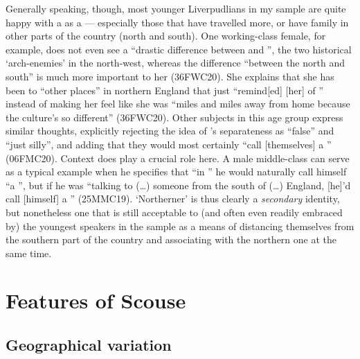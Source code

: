 Generally speaking, though, most younger Liverpudlians in my sample are quite happy with a  as a  --- especially those that have travelled more, or have family in other parts of the country (north and south).
One working-class female, for example, does not even see a ``drastic difference between  and '', the two historical `arch-enemies' in the north-west, whereas the difference ``between the north and south'' is much more important to her (36FWC20).
She explains that she has been to ``other places'' in northern England that just ``remind[ed] [her] of '' instead of making her feel like she was ``miles and miles away from home because the culture's so different'' (36FWC20).
Other subjects in this age group express similar thoughts, explicitly rejecting the idea of 's separateness as ``false'' and ``just silly'', and adding that they would most certainly ``call [themselves] a '' (06FMC20).
Context does play a crucial role here.
A male middle-class  can serve as a typical example when he specifies that ``in '' he would naturally call himself ``a '', but if he was ``talking to (\ldots) someone from the south of (\ldots) England, [he]'d call [himself] a '' (25MMC19).
`Northerner' is thus clearly a \emph{secondary} identity, but nonetheless one that is still acceptable to (and often even readily embraced by) the youngest  speakers in the sample as a means of distancing themselves from the southern part of the country and associating with the northern one at the same time.

\section{Features of Scouse}

\subsection{Geographical variation}


